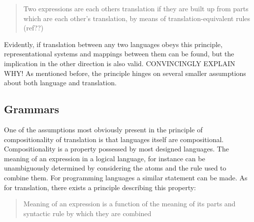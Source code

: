 \documentclass{report}
\theoremstyle{definition}
\theoremstyle{plain}
\begin{document}
\begin{quote}
Two expressions are each others translation if they are built up from parts which are each other's translation, by means of translation-equivalent rules (ref??)
\end{quote}

Evidently, if translation between any two languages obeys this principle, representational systems and mappings between them can be found, but the implication in the other direction is also valid. CONVINCINGLY EXPLAIN WHY!
As mentioned before, the principle hinges on several smaller assumptions about both language and translation.




\subsection{Grammars}

One of the assumptions most obviously present in the principle of compositionality of translation is that languages itself are compositional. Compositionality is a property possessed by most designed languages. The meaning of an expression in a logical language, for instance can be unambiguously determined by considering the atoms and the rule used to combine them. For programming languages a similar statement can be made. As for translation, there exists a principle describing this property:

\begin{quote}
Meaning of an expression is a function of the meaning of its parts and syntactic rule by which they are combined \cite{partee1984compositionality}
\end{quote}
\end{document}
